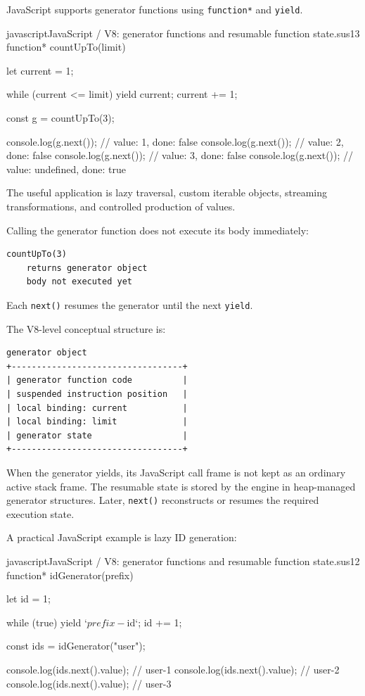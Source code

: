 JavaScript supports generator functions using \texttt{function*} and \texttt{yield}.

\begin{codebox}[]{javascript}{JavaScript / V8: generator functions and resumable function state.}{sus13}
function* countUpTo(limit) {
    let current = 1;

    while (current <= limit) {
        yield current;
        current += 1;
    }
}

const g = countUpTo(3);

console.log(g.next()); // { value: 1, done: false }
console.log(g.next()); // { value: 2, done: false }
console.log(g.next()); // { value: 3, done: false }
console.log(g.next()); // { value: undefined, done: true }
\end{codebox}


The useful application is lazy traversal, custom iterable objects, streaming transformations, and controlled production of values.

Calling the generator function does not execute its body immediately:

\begin{verbatim}
countUpTo(3)
    returns generator object
    body not executed yet
\end{verbatim}

Each \texttt{next()} resumes the generator until the next \texttt{yield}.

The V8-level conceptual structure is:

\begin{verbatim}
generator object
+----------------------------------+
| generator function code          |
| suspended instruction position   |
| local binding: current           |
| local binding: limit             |
| generator state                  |
+----------------------------------+
\end{verbatim}

When the generator yields, its JavaScript call frame is not kept as an ordinary active stack frame. The resumable state is stored by the engine in heap-managed generator structures. Later, \texttt{next()} reconstructs or resumes the required execution state.

A practical JavaScript example is lazy ID generation:

\begin{codebox}[]{javascript}{JavaScript / V8: generator functions and resumable function state.}{sus12}
function* idGenerator(prefix) {
    let id = 1;

    while (true) {
        yield `${prefix}-${id}`;
        id += 1;
    }
}

const ids = idGenerator("user");

console.log(ids.next().value); // user-1
console.log(ids.next().value); // user-2
console.log(ids.next().value); // user-3
\end{codebox}


